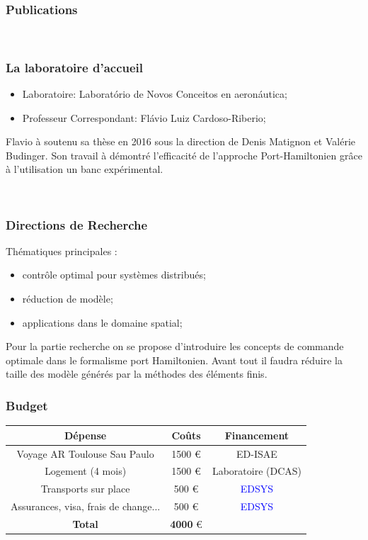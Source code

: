 \documentclass{beamer}
\begin{document}
\begin{frame}

\frametitle{Publications}
\nobibliography*
{} \\
\vspace{3mm}
\end{frame}



\begin{frame}
\frametitle{La laboratoire d'accueil}
\begin{itemize}
\item Laboratoire: Laborat\'orio de Novos Conceitos en aeron\'autica;
\item Professeur Correspondant: Fl\'avio Luiz Cardoso-Riberio;
\end{itemize}
Flavio à soutenu sa thèse en 2016 sous la direction de Denis Matignon et Valérie Budinger. Son travail à démontré l'efficacité de l'approche Port-Hamiltonien grâce à l'utilisation un banc expérimental.  

\footnotesize
{} \\
\vspace{3mm}
\end{frame}


\begin{frame}
\frametitle{Directions de Recherche}
Thématiques principales :
\begin{itemize}
	\item contrôle optimal pour systèmes distribués;
	\item réduction de modèle;
	\item applications dans le domaine spatial;
\end{itemize}
Pour la partie recherche on se propose d'introduire les concepts de commande optimale dans le formalisme port Hamiltonien. Avant tout il faudra réduire la taille des modèle générés par la méthodes des éléments finis.
\end{frame}


\begin{frame}
\frametitle{Budget}

\begin{tabular}{|c|c|c|}
	\hline 
	\textbf{Dépense}	& \textbf{Co\^uts} & \textbf{Financement} \\ 
	\hline 
	Voyage AR Toulouse Sau Paulo	& 1500 \euro  & ED-ISAE \\ 
	\hline 
	Logement (4 mois)	& 1500 \euro & Laboratoire (DCAS) \\ 
	\hline 
	Transports sur place & 500 \euro  & \textcolor{blue}{EDSYS} \\ 
	\hline
	Assurances, visa, frais de change... & 500 \euro  & \textcolor{blue}{EDSYS} \\ 
	\hline
	\textbf{Total}	& \textbf{4000} \euro &  \\ 
	\hline 
\end{tabular} 

\end{frame}
\end{document}
